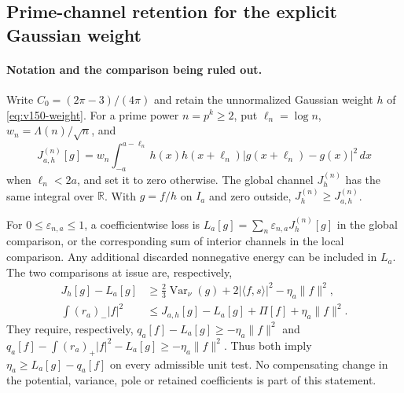 \documentclass[11pt]{article}
\theoremstyle{remark}
\begin{document}
\subsection*{Prime-channel retention for the explicit Gaussian weight}


\paragraph{Notation and the comparison being ruled out.}
Write $C_0=(2\pi-3)/(4\pi)$ and retain the unnormalized Gaussian weight
$h$ of \eqref{eq:v150-weight}. For a prime power $n=p^k\ge2$, put
$\ell_n=\log n$, $w_n=\Lambda(n)/\sqrt n$, and
\[
 J^{(n)}_{a,h}[g]
 =w_n\int_{-a}^{a-\ell_n}h(x)h(x+\ell_n)
                 |g(x+\ell_n)-g(x)|^2\,dx
\]
when $\ell_n<2a$, and set it to zero otherwise. The global channel
$J^{(n)}_h$ has the same integral over $\mathbb R$. With $g=f/h$ on
$I_a$ and zero outside, $J^{(n)}_h\ge J^{(n)}_{a,h}$.

For $0\le\varepsilon_{n,a}\le1$, a coefficientwise loss is
$L_a[g]=\sum_n\varepsilon_{n,a}J^{(n)}_h[g]$ in the global comparison,
or the corresponding sum of interior channels in the local comparison.
Any additional discarded nonnegative energy can be included in $L_a$.
The two comparisons at issue are, respectively,
\begin{align*}
 J_h[g]-L_a[g]&\ge\tfrac23\operatorname{Var}_\nu(g)
       +2|\langle f,s\rangle|^2-\eta_a\|f\|^2,\\
 \int(r_a)_-|f|^2&\le J_{a,h}[g]-L_a[g]+\Pi[f]
                                  +\eta_a\|f\|^2.
\end{align*}
They require, respectively, $q_a[f]-L_a[g]\ge-\eta_a\|f\|^2$
and $q_a[f]-\int(r_a)_+|f|^2-L_a[g]\ge-\eta_a\|f\|^2$.
Thus both imply $\eta_a\ge L_a[g]-q_a[f]$ on every admissible unit test.
No compensating change in the potential, variance, pole or retained
coefficients is part of this statement.
\end{document}
